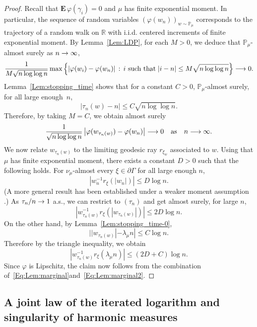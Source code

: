 \documentclass[10pt]{amsart}
\theoremstyle{definition}\newtheorem{defi}[theo]{Definition}\newtheorem{rema}[theo]{Remark}\newtheorem{exam}[theo]{Example}\newtheorem{exem}[theo]{Example}\newtheorem{nota}[theo]{Notation}
\newcommand{\f}{\varphi}
\newcommand{\R}{\mathbb{R}}
\renewcommand{\Pr}{\mathbb{P}}
\newcommand{\Eb}{\mathbf{E}\,}
\renewcommand{\(}{\left(}
\renewcommand{\)}{\right)}
\renewcommand*{\to}{\mathchoice{\longrightarrow}{\rightarrow}{\rightarrow}{\rightarrow}}
\begin{document}
\begin{proof}
Recall that $\Eb \f(\gamma_i)=0$ and $\mu$ has finite exponential moment. In particular, the sequence of random variables $(\varphi(w_{n}))_{w\sim \Pr_{\mu}}$ corresponds to the trajectory of a random walk on $\R$ with i.i.d. centered increments of finite exponential moment. By Lemma~\ref{Lem:LDP}, for each $M>0$, we deduce that $\Pr_{\mu}$-almost surely as $n \to \infty$,
\[
\frac{1}{M\sqrt{n\log \log n}}\max\left\{|\f(w_i)-\f(w_n)| \, : \, \text{$i$ such that}\;|i-n|\le M\sqrt{n\log \log n}\right\}\to 0.
\]
Lemma~\ref{Lem:stopping_time} shows that for a constant $C> 0$, $\Pr_{\mu}$-almost surely, for all large enough~$n$,
\[
|\tau_n(w)-n|\le C\sqrt{n\log \log n}.
\]
Therefore, by taking $M=C$, we obtain almost surely
\begin{equation}\label{Eq:Lem:marginal}
\frac{1}{\sqrt{n\log \log n}}\left|\f(w_{\tau_n(w)})-\f(w_n)\right| \to 0 \quad \text{as}\quad n \to \infty.
\end{equation}
We now relate $w_{\tau_n(w)}$ to the limiting geodesic ray $r_{\xi_{w}}$ associated to $w$. Using that $\mu$ has finite exponential moment, there exists a constant $D>0$ such that the following holds. For $\nu_\mu$-almost every $\xi \in \partial \Gamma$ for all large enough $n$,
\[
\left|w_n^{-1} r_\xi(|w_{n}|)\right| \le D \log n.
\]
(A more general result has been established under a weaker moment assumption \cite[Theorem~D]{ChoiCLT}.) As $\tau_{n}/n\to 1$ a.s., we can restrict to $(\tau_{n})$ and get almost surely, for large $n$,
\[
\left|w_{\tau_{n}(w)}^{-1} r_\xi(|w_{{\tau_{n}(w)}}|)\right| \le 2 D \log n.
\]
On the other hand, by Lemma~\ref{Lem:stopping_time-0},
\[
||w_{{\tau_{n}(w)}}| -\lambda_\mu n| \leq C \log n.
\]
Therefore by the triangle inequality, we obtain
\begin{equation}\label{Eq:Lem:marginal2}
\left|w_{\tau_{n}(w)}^{-1} r_\xi(\lambda_\mu n)\right| \le (2 D+C) \log n.
\end{equation}
Since $\varphi$ is Lipschitz, the claim now follows from the combination of~\eqref{Eq:Lem:marginal}\linebreak and~\eqref{Eq:Lem:marginal2}.
\end{proof}



\subsection{A joint law of the iterated logarithm and singularity of harmonic measures}
\end{document}
